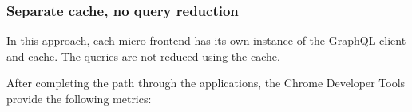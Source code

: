 \fi

\subsubsection{Separate cache, no query reduction}

In this approach, each micro frontend has its own instance of the GraphQL client and cache. The queries are not reduced using the cache.

After completing the path through the applications, the Chrome Developer Tools provide the following metrics:

